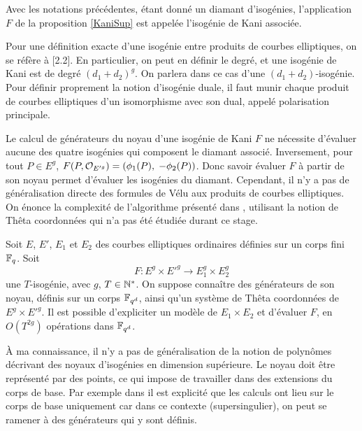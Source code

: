 \begin{Def}
	Avec les notations précédentes, étant donné un diamant d'isogénies, l'application $F$ de la proposition \ref{KaniSup} est appelée l'isogénie de Kani associée. 
\end{Def}

\begin{Rem}
	Pour une définition exacte d'une isogénie entre produits de courbes elliptiques, on se réfère à \cite{Pegasis}[2.2]. En particulier, on peut en définir le degré, et une isogénie de Kani est de degré $(d_1 + d_2)^g$. On parlera dans ce cas d'une $(d_1 + d_2)$-isogénie. Pour définir proprement la notion d'isogénie duale, il faut munir chaque produit de courbes elliptiques d'un isomorphisme avec son dual, appelé polarisation principale. 
\end{Rem}

Le calcul de générateurs du noyau d'une isogénie de Kani $F$ ne nécessite d'évaluer aucune des quatre isogénies qui composent le diamant associé. Inversement, pour tout $P\in E^g$, $F(P,\mathcal{O}_{E'^g}) = (\phi_1(P),\;-\phi_2(P))$. Donc savoir évaluer $F$ à partir de son noyau permet d'évaluer les isogénies du diamant. Cependant, il n'y a pas de généralisation directe des formules de Vélu aux produits de courbes elliptiques. On énonce la complexité de l'algorithme présenté dans \cite{ThetaRobert}, utilisant la notion de Thêta coordonnées qui n'a pas été étudiée durant ce stage.

\begin{Prop}\label{COMPLEX ThetaRobert} 
	Soit $E$, $E'$, $E_1$ et $E_2$ des courbes elliptiques ordinaires définies sur un corps fini $\mathbb{F}_{q}$. Soit 
	\begin{equation*}
		F : E^g\times E'^g\rightarrow E_1^g\times E_2^g
	\end{equation*}
	une $T$-isogénie, avec $g$, $T\in\mathbb{N}^{*}$. On suppose connaître des générateurs de son noyau, définis sur un corps $\mathbb{F}_{q^d}$, ainsi qu'un système de Thêta coordonnées de $E^g\times E'^g$. Il est possible d'expliciter un modèle de $E_1\times E_2$ et d'évaluer $F$, en $O(T^{2g})$ opérations dans $\mathbb{F}_{q^d}$.
\end{Prop}

\begin{Rem}
	À ma connaissance, il n'y a pas de généralisation de la notion de polynômes décrivant des noyaux d'isogénies en dimension supérieure. Le noyau doit être représenté par des points, ce qui impose de travailler dans des extensions du corps de base. Par exemple dans \cite{Pegasis} il est explicité que les calculs ont lieu sur le corps de base uniquement car dans ce contexte (supersingulier), on peut se ramener à des générateurs qui y sont définis. 
\end{Rem}

